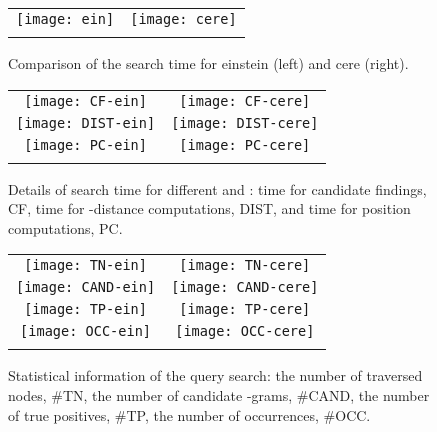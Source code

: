 \documentclass[12pt,a4paper]{scrartcl}
\begin{document}
\begin{figure}[t]
\begin{center}
\begin{tabular}{cc}
\hspace{1.5cm}
\texttt{[image: ein]} &
\texttt{[image: cere]} \\\\
\end{tabular}
\end{center}
\caption{Comparison of the search time for einstein (left) and cere (right).}
\label{time}
\end{figure}

\begin{figure}[t]
\begin{center}
\begin{tabular}{cc}
\hspace{1.5cm}
\texttt{[image: CF-ein]} & 
\texttt{[image: CF-cere]} \\
\hspace{1.5cm}
\texttt{[image: DIST-ein]} & 
\texttt{[image: DIST-cere]} \\
\hspace{1.5cm}
\texttt{[image: PC-ein]} & 
\texttt{[image: PC-cere]} \\\\
\end{tabular}
\end{center}
\vspace{1.5cm}
\caption{Details of search time for different  and :
time for candidate findings, CF, time for -distance computations, DIST, and
time for position computations, PC.}
\label{time-detail}
\end{figure}

\begin{figure}[t]
\begin{center}
\begin{tabular}{cc}
\hspace{1.8cm}
\texttt{[image: TN-ein]} &
\texttt{[image: TN-cere]} \\
\hspace{1.8cm}
\texttt{[image: CAND-ein]} &
\texttt{[image: CAND-cere]} \\
\hspace{1.8cm}
\texttt{[image: TP-ein]} &
\texttt{[image: TP-cere]} \\
\hspace{1.8cm}
\texttt{[image: OCC-ein]} &
\texttt{[image: OCC-cere]} \\\\
\end{tabular}
\end{center}
\caption{Statistical information of the query search: the number of traversed nodes, \#TN,
the number of candidate -grams, \#CAND, 
the number of true positives, \#TP, the number of occurrences, \#OCC.}
\label{statistical}
\end{figure}
\end{document}
